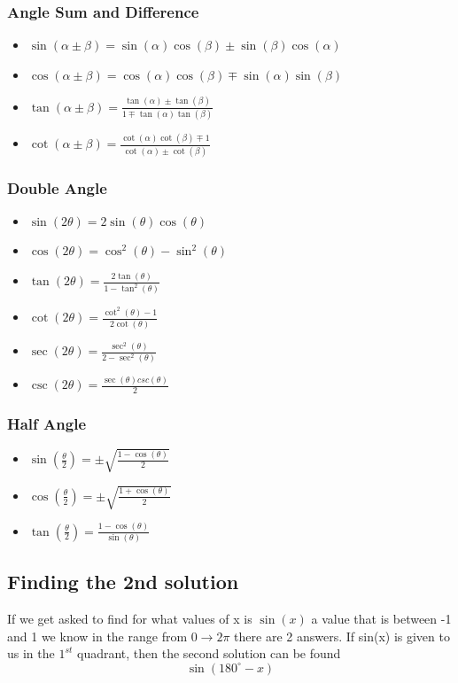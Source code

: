\documentclass[a4paper, 15pt]{article}
\begin{document}
			\subsubsection{Angle Sum and Difference}
				\begin{itemize}
					\item $\sin(\alpha \pm \beta) = \sin(\alpha)\cos(\beta) \pm \sin(\beta)\cos(\alpha)$
					\item $\cos(\alpha \pm \beta) = \cos(\alpha)\cos(\beta) \mp \sin(\alpha)\sin(\beta)$
					\item $\tan(\alpha \pm \beta) = \frac{\tan(\alpha) \pm \tan(\beta)}{1 \mp \tan(\alpha)\tan(\beta)}$ 
					\item $\cot(\alpha \pm \beta) = \frac{\cot(\alpha)\cot(\beta) \mp 1}{\cot(\alpha) \pm \cot(\beta)}$
				\end{itemize}

			\subsubsection{Double Angle}
				\begin{itemize}
					\item $\sin(2\theta) = 2\sin(\theta)\cos(\theta)$
					\item $\cos(2\theta) = \cos^2(\theta) - \sin^2(\theta)$
					\item $\tan(2\theta) = \frac{2\tan(\theta)}{1-\tan^2(\theta)}$
					\item $\cot(2\theta) = \frac{\cot^2(\theta) - 1}{2\cot(\theta)}$
					\item $\sec(2\theta) = \frac{\sec^2(\theta)}{2-\sec^2(\theta)}$
					\item $\csc(2\theta) = \frac{\sec(\theta)csc(\theta)}{2}$
				\end{itemize}
			\subsubsection{Half Angle}
				\begin{itemize}
					\item $\sin(\frac{\theta}{2}) = \pm \sqrt{\frac{1-\cos(\theta)}{2}}$
					\item $\cos(\frac{\theta}{2}) = \pm  \sqrt{\frac{1+\cos(\theta)}{2}}$
					\item $\tan(\frac{\theta}{2}) = \frac{1-\cos(\theta)}{\sin(\theta)}$
				\end{itemize}	

		\subsection{Finding the 2nd solution}
			\noindent If we get asked to find for what values of x is $\sin(x)$ a value that is between -1 and 1 we know in the range from $0 \rightarrow 2\pi$ there are 2 answers. If sin(x) is given to us in the $1^{st}$ quadrant, then the second solution
			can be found 
				\[\sin(180^{\circ} - x)\]
			
\end{document}

